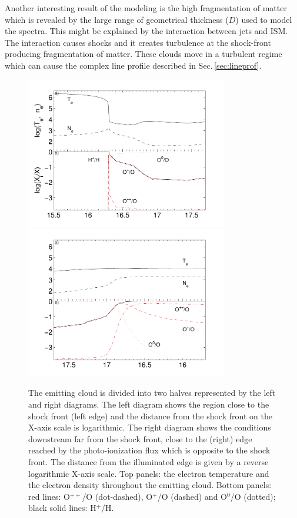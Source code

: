 \documentclass[../main.tex]{subfiles}
\begin{document}
Another interesting result of the modeling is the high fragmentation of matter which is revealed by the large range of geometrical thickness ($D$) used to model the spectra.
This might be explained by the interaction between jets and ISM.
The interaction causes shocks and it creates turbulence at the shock-front producing fragmentation of matter.
These clouds move in a turbulent regime which can cause the complex line profile described in Sec.\,\ref{sec:lineprof}. 

\begin{figure}
\centering
\includegraphics[width=8.8cm]{images/paper1/bin4l.pdf}
\includegraphics[width=8.8cm]{images/paper1/bin4r.pdf}
\caption{The emitting cloud is divided into two halves represented by the left and right  diagrams.  
The left diagram shows the region close to the shock front (left edge) and the distance from the shock front on the X-axis scale is logarithmic.
The right diagram shows the conditions downstream far from the shock front, close to the (right) edge reached by the photo-ionization flux which is opposite to the shock front.  
The distance from the illuminated edge is given by a reverse logarithmic X-axis scale.
Top panels: the electron temperature and  the electron density throughout the emitting cloud.
Bottom panels: red lines: O$^{++}$/O (dot-dashed),  O$^+$/O (dashed) and O$^0$/O (dotted); black solid lines: H$^+$/H. 
}
\label{fig:sumamod}
\end{figure}
\end{document}
